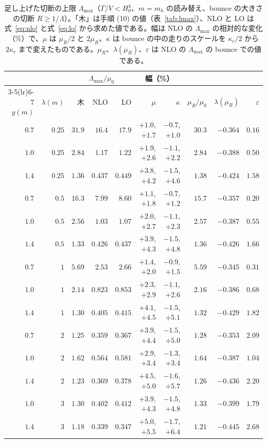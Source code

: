 \documentclass[a4paper,10pt]{ltjsarticle}
\begin{document}
\begin{table}[tbp]
\centering\small
\caption{足し上げた切断の上限 $\Lambda_{\max}$（$\Gamma/V<H_0^4$、$m=m_h$ の読み替え、bounce の大きさの切断 $R\ge1/\Lambda$）。「木」は手順 (10) の値（表~\ref{tab:lmax}）、NLO と LO は式~\eqref{eq:nlo} と式~\eqref{eq:lo} から求めた値である。幅は NLO の $\Lambda_{\max}$ の相対的な変化（\%）で、$\mu$ は $\mu_R/2$ と $2\mu_R$、$\kappa$ は bounce の中の走りのスケールを $\kappa_c/2$ から $2\kappa_c$ まで変えたものである。$\mu_R$、$\lambda(\mu_R)$、$\varepsilon$ は NLO の $\Lambda_{\max}$ の bounce での値である。}
\label{tab:resumlmax}
\setlength{\tabcolsep}{3.5pt}
\begin{tabular}{rrrrrrrrrr}
\toprule
& & \multicolumn{3}{c}{$\Lambda_{\max}/\mu_0$} & \multicolumn{2}{c}{幅（\%）} & & & \\
\cmidrule(lr){3-5}\cmidrule(lr){6-7}
$y(m)$ & $\lambda(m)$ & 木 & NLO & LO & $\mu$ & $\kappa$ & $\mu_R/\mu_0$ & $\lambda(\mu_R)$ & $\varepsilon$ \\
\midrule
$0.7$ & $0.25$ & $31.9$ & $16.4$ & $17.9$ & $+1.0$, $+1.7$ & $-0.7$, $+1.0$ & $30.3$ & $-0.364$ & $0.16$ \\
$1.0$ & $0.25$ & $2.84$ & $1.17$ & $1.22$ & $+1.9$, $+2.6$ & $-1.1$, $+2.2$ & $2.84$ & $-0.388$ & $0.50$ \\
$1.4$ & $0.25$ & $1.36$ & $0.437$ & $0.449$ & $+3.8$, $+4.2$ & $-1.5$, $+4.6$ & $1.38$ & $-0.424$ & $1.58$ \\
$0.7$ & $0.5$ & $16.3$ & $7.99$ & $8.60$ & $+1.1$, $+1.8$ & $-0.7$, $+1.2$ & $15.7$ & $-0.357$ & $0.20$ \\
$1.0$ & $0.5$ & $2.56$ & $1.03$ & $1.07$ & $+2.0$, $+2.7$ & $-1.1$, $+2.3$ & $2.57$ & $-0.387$ & $0.55$ \\
$1.4$ & $0.5$ & $1.33$ & $0.426$ & $0.437$ & $+3.9$, $+4.3$ & $-1.5$, $+4.8$ & $1.36$ & $-0.426$ & $1.66$ \\
$0.7$ & $1$ & $5.69$ & $2.53$ & $2.66$ & $+1.4$, $+2.0$ & $-0.9$, $+1.5$ & $5.59$ & $-0.345$ & $0.31$ \\
$1.0$ & $1$ & $2.14$ & $0.823$ & $0.853$ & $+2.3$, $+2.9$ & $-1.1$, $+2.6$ & $2.16$ & $-0.386$ & $0.68$ \\
$1.4$ & $1$ & $1.30$ & $0.405$ & $0.415$ & $+4.1$, $+4.5$ & $-1.5$, $+5.1$ & $1.32$ & $-0.429$ & $1.82$ \\
$0.7$ & $2$ & $1.25$ & $0.359$ & $0.367$ & $+3.9$, $+4.4$ & $-1.5$, $+5.0$ & $1.28$ & $-0.353$ & $2.09$ \\
$1.0$ & $2$ & $1.62$ & $0.564$ & $0.581$ & $+2.9$, $+3.4$ & $-1.3$, $+3.4$ & $1.64$ & $-0.387$ & $1.04$ \\
$1.4$ & $2$ & $1.23$ & $0.369$ & $0.378$ & $+4.5$, $+5.0$ & $-1.6$, $+5.7$ & $1.26$ & $-0.436$ & $2.20$ \\
$1.0$ & $3$ & $1.30$ & $0.402$ & $0.412$ & $+3.9$, $+4.3$ & $-1.5$, $+4.8$ & $1.33$ & $-0.399$ & $1.79$ \\
$1.4$ & $3$ & $1.18$ & $0.339$ & $0.347$ & $+5.0$, $+5.5$ & $-1.7$, $+6.4$ & $1.21$ & $-0.445$ & $2.68$ \\
\bottomrule
\end{tabular}
\end{table}
\end{document}
